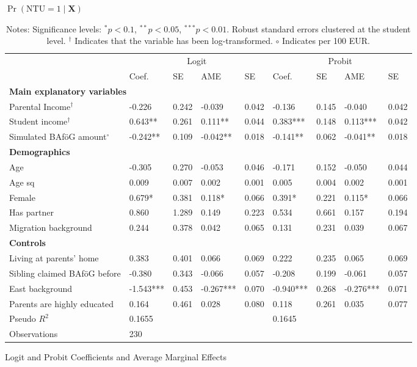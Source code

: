 \begin{table}
\caption{$\Pr(\mathrm{NTU} = 1 \mid \mathbf{X})$}
\renewcommand{\arraystretch}{1.25}
\footnotesize
\centering
\begin{tabular}{lllllllll}
\toprule
 & \multicolumn{4}{c}{Logit} & \multicolumn{4}{c}{Probit} \\
\cmidrule(lr){2-5} \cmidrule(lr){6-9}
 & Coef. & SE & AME & SE & Coef. & SE & AME & SE \\
\midrule
\multicolumn{9}{l}{\textbf{Main explanatory variables}} \\
Parental Income$^\dagger$ & -0.226 & 0.242 & -0.039 & 0.042 & -0.136 & 0.145 & -0.040 & 0.042 \\
Student income$^\dagger$ & 0.643** & 0.261 & 0.111** & 0.044 & 0.383*** & 0.148 & 0.113*** & 0.042 \\
Simulated BAföG amount$^{\circ}$ & -0.242** & 0.109 & -0.042** & 0.018 & -0.141** & 0.062 & -0.041** & 0.018 \\
\midrule
\multicolumn{9}{l}{\textbf{Demographics}} \\
Age & -0.305 & 0.270 & -0.053 & 0.046 & -0.171 & 0.152 & -0.050 & 0.044 \\
Age sq & 0.009 & 0.007 & 0.002 & 0.001 & 0.005 & 0.004 & 0.002 & 0.001 \\
Female & 0.679* & 0.381 & 0.118* & 0.066 & 0.391* & 0.221 & 0.115* & 0.066 \\
Has partner & 0.860 & 1.289 & 0.149 & 0.223 & 0.534 & 0.661 & 0.157 & 0.194 \\
Migration background & 0.244 & 0.378 & 0.042 & 0.065 & 0.131 & 0.231 & 0.039 & 0.067 \\
\midrule
\multicolumn{9}{l}{\textbf{Controls}} \\
Living at parents’ home & 0.383 & 0.401 & 0.066 & 0.069 & 0.222 & 0.235 & 0.065 & 0.069 \\
Sibling claimed BAföG before & -0.380 & 0.343 & -0.066 & 0.057 & -0.208 & 0.199 & -0.061 & 0.057 \\
East background & -1.543*** & 0.453 & -0.267*** & 0.070 & -0.940*** & 0.268 & -0.276*** & 0.071 \\
Parents are highly educated & 0.164 & 0.461 & 0.028 & 0.080 & 0.118 & 0.261 & 0.035 & 0.077 \\
\midrule
Pseudo $R^2$ & \multicolumn{4}{l}{0.1655} & \multicolumn{4}{l}{0.1645} \\
Observations & \multicolumn{8}{l}{230} \\
\bottomrule
\end{tabular}
\caption*{Logit and Probit Coefficients and Average Marginal Effects}
\label{tab:logit_probit_results}
\caption*{\small{Notes: Significance levels: $^{{*}} p < 0.1$, $^{{**}} p < 0.05$, $^{{***}} p < 0.01$. Robust standard errors clustered at the student level. $^\dagger$ Indicates that the variable has been log-transformed. $\circ$ Indicates per 100 EUR.}}
\end{table}
